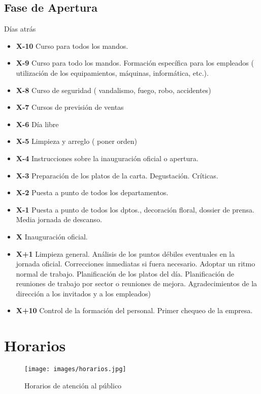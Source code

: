 \subsection{Fase de Apertura}
\label{sec:apertura}

Días atrás

\begin{itemize}[label={}]
\item \textbf{X-10} Curso para todos los mandos.
\item \textbf{X-9} Curso para todo los mandos. Formación específica para los empleados ( utilización de los equipamientos, máquinas, informática, etc.).
\item \textbf{X-8} Curso de seguridad ( vandalismo, fuego, robo, accidentes)
\item \textbf{X-7} Cursos de previsión de ventas
\item \textbf{X-6} Día libre
\item \textbf{X-5} Limpieza y arreglo ( poner orden)
\item \textbf{X-4} Instrucciones sobre la inauguración oficial o apertura.
\item \textbf{X-3} Preparación de los platos de la carta. Degustación. Críticas.
\item \textbf{X-2} Puesta a punto de todos los departamentos.
\item \textbf{X-1} Puesta a punto de todos los dptos., decoración floral, dossier de prensa. Media jornada de descanso.
\item \textbf{X}   Inauguración oficial.
\item \textbf{X+1} Limpieza general. Análisis de los puntos débiles eventuales en la jornada oficial. Correcciones inmediatas si fuera necesario. Adoptar un ritmo normal de trabajo. Planificación de los platos del día. Planificación de reuniones de trabajo por sector o reuniones de mejora. Agradecimientos de la dirección a los invitados y a los empleados)
\item \textbf{X+10} Control de la formación del personal. Primer chequeo de la empresa.
\end{itemize}

\section{Horarios}
\label{sec:horarios}

\begin{figure}[h]
  \begin{center}
    \texttt{[image: images/horarios.jpg]}
    \caption{Horarios de atención al público}
    \label{fig:horarios}
  \end{center}
\end{figure}

